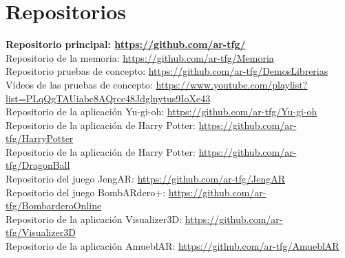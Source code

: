 \chapter*{Repositorios}
\textbf{Repositorio principal: \url{https://github.com/ar-tfg/}}\\

Repositorio de la memoria: \url{https://github.com/ar-tfg/Memoria}\\

Repositorio pruebas de concepto: \url{https://github.com/ar-tfg/DemosLibrerias}\\

Vídeos de las pruebas de concepto: \url{https://www.youtube.com/playlist?list=PLqQgTAUiabc8AQrcc48Jdglnytus9IoXe43}\\

Repositorio de la aplicación Yu-gi-oh: \url{https://github.com/ar-tfg/Yu-gi-oh}\\

Repositorio de la aplicación de Harry Potter: \url{https://github.com/ar-tfg/HarryPotter}\\

Repositorio de la aplicación de Harry Potter: \url{https://github.com/ar-tfg/DragonBall}\\

Repositorio del juego JengAR: \url{https://github.com/ar-tfg/JengAR}\\

Repositorio del juego BombARdero+: \url{https://github.com/ar-tfg/BombarderoOnline}\\

Repositorio de la aplicación Visualizer3D: \url{https://github.com/ar-tfg/Visualizer3D}\\

Repositorio de la aplicación AmueblAR: \url{https://github.com/ar-tfg/AmueblAR}\\
